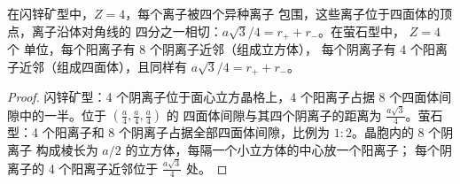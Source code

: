 \begin{proposition}[闪锌矿型与萤石型]\label{prop:b1:crystals-ionic-covalent:zns-caf2}
在闪锌矿型中，$Z = 4$，每个离子被四个异种离子
包围，这些离子位于四面体的顶点，离子沿体对角线的
四分之一相切：$a\sqrt3/4 = r_+ + r_-$。在萤石型中，
$Z = 4$ 个  单位，每个阳离子有 8 个阴离子近邻（组成立方体），
每个阴离子有 4 个阳离子近邻（组成四面体），且同样有 $a\sqrt3/4 =
r_+ + r_-$。
\end{proposition}

\begin{proof}
闪锌矿型：4 个阴离子位于面心立方晶格上，4 个阳离子占据
8 个四面体间隙中的一半。位于 $(\frac a4,\frac a4,\frac a4)$ 的
四面体间隙与其四个阴离子的距离为 $\frac{a\sqrt3}{4}$。萤石型：4 个阳离子和
8 个阴离子占据全部四面体间隙，比例为 $1:2$。晶胞内的 8 个阴离子
构成棱长为 $a/2$ 的立方体，每隔一个小立方体的中心放一个阳离子；
每个阴离子的 4 个阳离子近邻位于
$\frac{a\sqrt3}{4}$ 处。
\end{proof}

